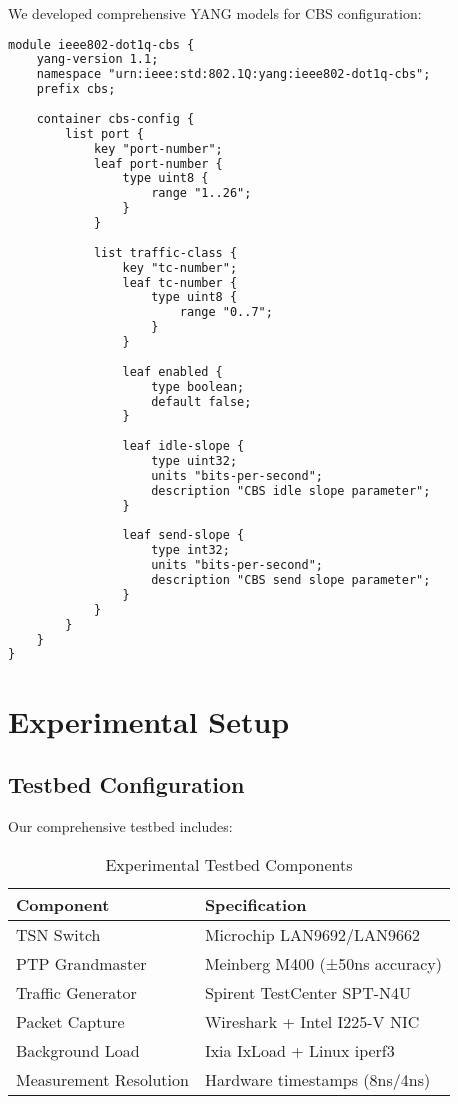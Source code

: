 \documentclass[10pt, journal, compsoc]{IEEEtran}
\begin{document}
We developed comprehensive YANG models for CBS configuration:

\begin{lstlisting}[language=XML, caption=CBS YANG Model Excerpt]
module ieee802-dot1q-cbs {
    yang-version 1.1;
    namespace "urn:ieee:std:802.1Q:yang:ieee802-dot1q-cbs";
    prefix cbs;
    
    container cbs-config {
        list port {
            key "port-number";
            leaf port-number {
                type uint8 {
                    range "1..26";
                }
            }
            
            list traffic-class {
                key "tc-number";
                leaf tc-number {
                    type uint8 {
                        range "0..7";
                    }
                }
                
                leaf enabled {
                    type boolean;
                    default false;
                }
                
                leaf idle-slope {
                    type uint32;
                    units "bits-per-second";
                    description "CBS idle slope parameter";
                }
                
                leaf send-slope {
                    type int32;
                    units "bits-per-second";
                    description "CBS send slope parameter";
                }
            }
        }
    }
}
\end{lstlisting}

\section{Experimental Setup}

\subsection{Testbed Configuration}

Our comprehensive testbed includes:

\begin{table}[h]
\centering
\caption{Experimental Testbed Components}
\label{tab:testbed}
\begin{tabular}{ll}
\toprule
\textbf{Component} & \textbf{Specification} \\
\midrule
TSN Switch & Microchip LAN9692/LAN9662 \\
PTP Grandmaster & Meinberg M400 (±50ns accuracy) \\
Traffic Generator & Spirent TestCenter SPT-N4U \\
Packet Capture & Wireshark + Intel I225-V NIC \\
Background Load & Ixia IxLoad + Linux iperf3 \\
Measurement Resolution & Hardware timestamps (8ns/4ns) \\
\bottomrule
\end{tabular}
\end{table}
\end{document}
